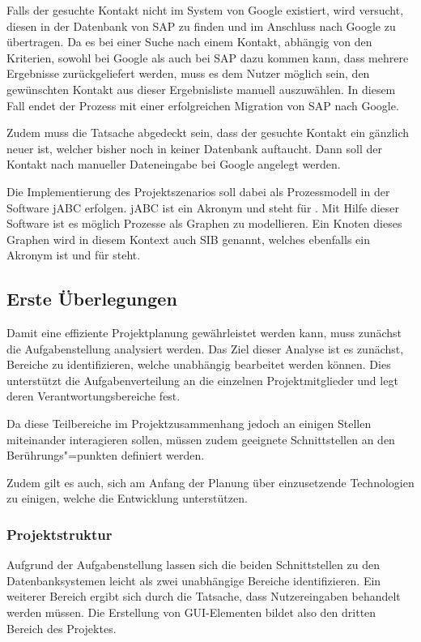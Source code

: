 Falls der gesuchte Kontakt nicht im System von Google existiert, wird versucht, diesen in der Datenbank
 von SAP zu finden und im Anschluss nach Google zu übertragen.
Da es bei einer Suche nach einem Kontakt, abhängig von den Kriterien, sowohl bei Google als auch bei SAP
 dazu kommen kann, dass mehrere Ergebnisse zurückgeliefert werden, muss es dem Nutzer möglich sein, den
 gewünschten Kontakt aus dieser Ergebnisliste manuell auszuwählen.
In diesem Fall endet der Prozess mit einer erfolgreichen Migration von SAP nach Google.

Zudem muss die Tatsache abgedeckt sein, dass der gesuchte Kontakt ein gänzlich neuer ist, welcher bisher
 noch in keiner Datenbank auftaucht. Dann soll der Kontakt nach manueller Dateneingabe bei Google angelegt werden.
 
Die Implementierung des Projektszenarios soll dabei als Prozessmodell in der Software jABC erfolgen. jABC ist ein Akronym und steht für . Mit Hilfe dieser Software ist es möglich Prozesse als Graphen zu modellieren. Ein Knoten dieses Graphen wird in diesem Kontext auch SIB genannt, welches ebenfalls ein Akronym ist und für  steht.

\subsection{Erste Überlegungen}
Damit eine effiziente Projektplanung gewährleistet werden kann, muss zunächst die Aufgabenstellung
 analysiert werden.
Das Ziel dieser Analyse ist es zunächst, Bereiche zu identifizieren, welche unabhängig bearbeitet werden können.
Dies unterstützt die Aufgabenverteilung an die einzelnen Projektmitglieder und legt deren Verantwortungsbereiche fest.

Da diese Teilbereiche im Projektzusammenhang jedoch an einigen Stellen miteinander interagieren sollen, müssen
 zudem geeignete Schnittstellen an den Berührungs"=punkten definiert werden.
 
Zudem gilt es auch, sich am Anfang der Planung über einzusetzende Technologien zu einigen, welche die Entwicklung unterstützen.

\subsubsection{Projektstruktur}
Aufgrund der Aufgabenstellung lassen sich die beiden Schnittstellen zu den Datenbanksystemen leicht als zwei
 unabhängige Bereiche identifizieren.
Ein weiterer Bereich ergibt sich durch die Tatsache, dass Nutzereingaben behandelt werden müssen.
Die Erstellung von GUI-Elementen bildet also den dritten Bereich des Projektes.

